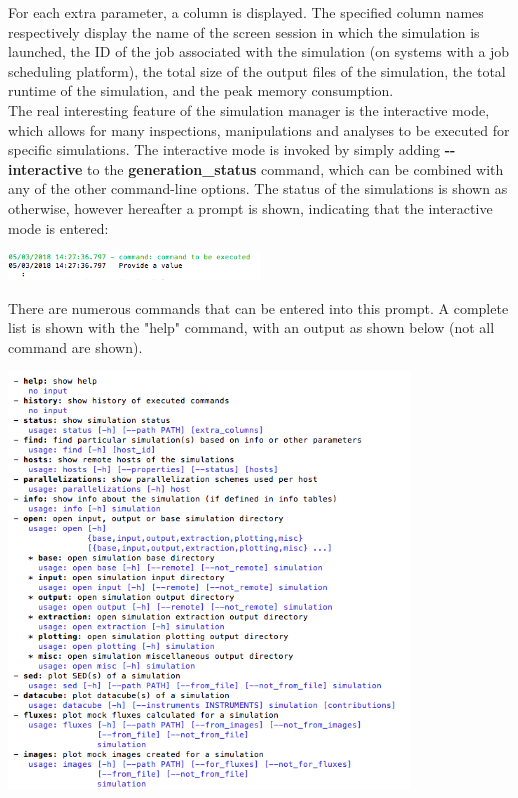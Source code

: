 \documentclass[15pt,a4paper,oneside,openright]{report}
\begin{document}
For each extra parameter, a column is displayed. The specified column names respectively display the name of the screen session in which the simulation is launched, the ID of the job associated with the simulation (on systems with a job scheduling platform), the total size of the output files of the simulation, the total runtime of the simulation, and the peak memory consumption.\\

The real interesting feature of the simulation manager is the interactive mode, which allows for many inspections, manipulations and analyses to be executed for specific simulations. The interactive mode is invoked by simply adding \textbf{-{}-interactive} to the \textbf{generation\_status} command, which can be combined with any of the other command-line options. The status of the simulations is shown as otherwise, however hereafter a prompt is shown, indicating that the interactive mode is entered:

\begin{center}
\includegraphics[width=0.5\textwidth]{figures/interactive.png}
\end{center}

There are numerous commands that can be entered into this prompt. A complete list is shown with the "help" command, with an output as shown below (not all command are shown).

\begin{center}
\includegraphics[width=0.8\textwidth]{figures/help.png}
\end{center}
\end{document}
